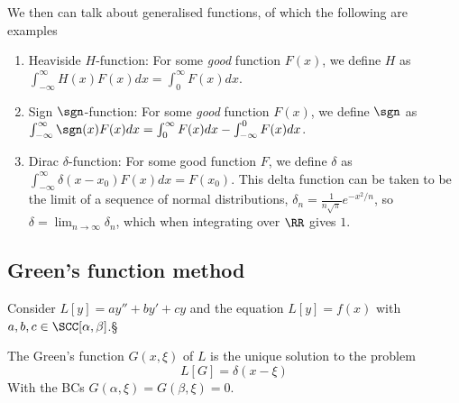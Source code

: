 We then can talk about generalised functions, of which the following are examples
\begin{enumerate}
  \item Heaviside $H$-function: For some \emph{good} function $F(x)$, we define $H$ as
    $\int_{-\infty}^{\infty} H(x)F(x)dx = \int_{0}^{\infty} F(x) dx$.
  \item Sign $\sgn$-function: For some \emph{good} function $F(x)$, we define $\sgn$ as
    $\int_{-\infty}^{\infty} \sgn(x)F(x) dx = \int_{0}^{\infty}F(x)dx - \int_{-\infty}^0
    F(x)dx$.
  \item Dirac $\delta$-function: For some good function $F$, we define $\delta$ as
    $\int_{-\infty}^{\infty} \delta(x-x_0) F(x) dx = F(x_0)$. This delta function can be
    taken to be the limit of a sequence of normal distributions,
    $\delta_n=\frac{1}{n\sqrt{\pi}}e^{-x^2/n}$, so $\delta=\lim_{n\to\infty}\delta_n$,
    which when integrating over $\RR$ gives $1$.
\end{enumerate}

\subsection{Green's function method}
Consider $L[y]=ay''+by'+cy$ and the equation $L[y]=f(x)$ with
$a,b,c\in\SCC[\alpha,\beta]$.§
\begin{definition}
  The Green's function $G(x, \xi)$ of $L$ is the unique solution to the problem
  \[L[G]= \delta(x-\xi)\]
  With the BCs $G(\alpha,\xi)=G(\beta,\xi)=0$.
  \label{def:greenFun}
\end{definition}

